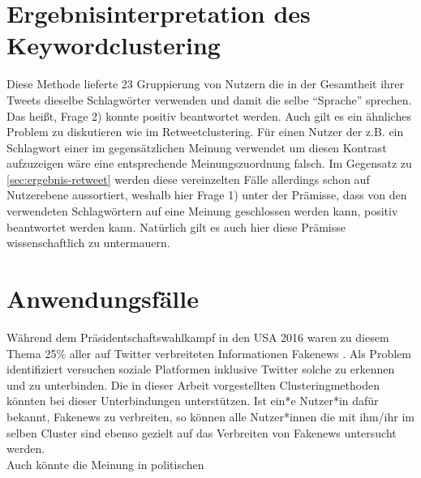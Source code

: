 \section{Ergebnisinterpretation des Keywordclustering}
Diese Methode lieferte 23 Gruppierung von Nutzern die in der Gesamtheit ihrer Tweets dieselbe Schlagwörter verwenden und damit die selbe "`Sprache"' sprechen. Das heißt, Frage 2) konnte positiv beantwortet werden. Auch gilt es  ein ähnliches Problem zu diskutieren wie im Retweetclustering.
Für einen Nutzer der z.B. ein Schlagwort einer im gegensätzlichen Meinung verwendet um diesen Kontrast aufzuzeigen wäre eine entsprechende Meinungszuordnung falsch.
Im Gegensatz zu \ref{sec:ergebnis-retweet} werden diese vereinzelten Fälle allerdings schon auf Nutzerebene aussortiert, weshalb hier Frage 1) unter der Prämisse, dass von den verwendeten Schlagwörtern auf eine Meinung geschlossen werden kann, positiv beantwortet werden kann.
Natürlich gilt es auch hier diese Prämisse wissenschaftlich zu untermauern.

\section{Anwendungsfälle}
Während dem Präsidentschaftswahlkampf in den USA 2016 waren zu diesem Thema 25\% aller auf Twitter verbreiteten Informationen \gls{Fakenews} \cite{fake-news}.
Als Problem identifiziert versuchen soziale Platformen inklusive Twitter solche zu erkennen und zu unterbinden. 
Die in dieser Arbeit vorgestellten Clusteringmethoden könnten bei dieser Unterbindungen unterstützen. Ist ein*e Nutzer*in dafür bekannt, Fakenews zu verbreiten, so können alle Nutzer*innen die mit ihm/ihr im selben Cluster sind ebenso gezielt auf das Verbreiten von Fakenews untersucht werden. \\ \newline
Auch könnte die Meinung in politischen 